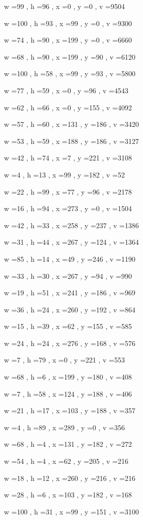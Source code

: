 \documentclass[11pt]{article}
\begin{document}
w =99 , h =96 , x =0 , y =0 , v =9504
\par
w =100 , h =93 , x =99 , y =0 , v =9300
\par
w =74 , h =90 , x =199 , y =0 , v =6660
\par
w =68 , h =90 , x =199 , y =90 , v =6120
\par
w =100 , h =58 , x =99 , y =93 , v =5800
\par
w =77 , h =59 , x =0 , y =96 , v =4543
\par
w =62 , h =66 , x =0 , y =155 , v =4092
\par
w =57 , h =60 , x =131 , y =186 , v =3420
\par
w =53 , h =59 , x =188 , y =186 , v =3127
\par
w =42 , h =74 , x =7 , y =221 , v =3108
\par
w =4 , h =13 , x =99 , y =182 , v =52
\par
w =22 , h =99 , x =77 , y =96 , v =2178
\par
w =16 , h =94 , x =273 , y =0 , v =1504
\par
w =42 , h =33 , x =258 , y =237 , v =1386
\par
w =31 , h =44 , x =267 , y =124 , v =1364
\par
w =85 , h =14 , x =49 , y =246 , v =1190
\par
w =33 , h =30 , x =267 , y =94 , v =990
\par
w =19 , h =51 , x =241 , y =186 , v =969
\par
w =36 , h =24 , x =260 , y =192 , v =864
\par
w =15 , h =39 , x =62 , y =155 , v =585
\par
w =24 , h =24 , x =276 , y =168 , v =576
\par
w =7 , h =79 , x =0 , y =221 , v =553
\par
w =68 , h =6 , x =199 , y =180 , v =408
\par
w =7 , h =58 , x =124 , y =188 , v =406
\par
w =21 , h =17 , x =103 , y =188 , v =357
\par
w =4 , h =89 , x =289 , y =0 , v =356
\par
w =68 , h =4 , x =131 , y =182 , v =272
\par
w =54 , h =4 , x =62 , y =205 , v =216
\par
w =18 , h =12 , x =260 , y =216 , v =216
\par
w =28 , h =6 , x =103 , y =182 , v =168
\par
w =100 , h =31 , x =99 , y =151 , v =3100
\par
\newpage
\end{document}
